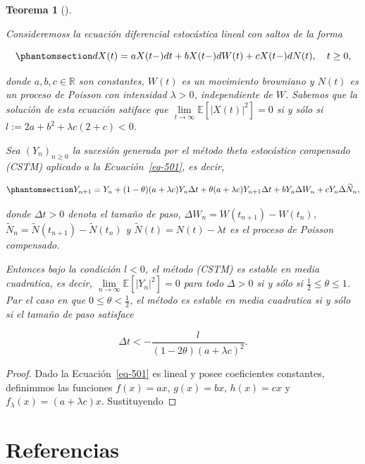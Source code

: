 \documentclass[
  spanish,
  us-letterpaper,
]{scrreprt}
\theoremstyle{plain}
\theoremstyle{plain}
\theoremstyle{definition}
\theoremstyle{plain}
\newtheorem{theorem}{Teorema}[chapter]
\theoremstyle{remark}
\begin{document}
\begin{theorem}[]\protect\hypertarget{thm-varmues}{}\label{thm-varmues}

Consideremoss la ecuación diferencial estocástica lineal con saltos de
la forma

\begin{equation}\phantomsection\label{eq-501}{
    dX(t)=aX(t-)dt+bX(t-)dW(t)+cX(t-)dN(t),\ \ \ t\geq 0,
}\end{equation}

donde \(a,b,c\in \mathbb{R}\) son constantes, \(W(t)\) es un movimiento
browniano y \(N(t)\) es un proceso de Poisson con intensidad
\(\lambda>0\), independiente de \(W\). Sabemos que la solución de esta
ecuación satiface que
\(\displaystyle \lim\limits_{t\rightarrow\infty}\mathbb{E}[|X(t)|^2]=0\)
si y sólo si \(l:=2a+b^2+\lambda c(2+c)<0\).

Sea \((Y_n)_{n\geq 0}\) la sucesión generada por el método theta
estocástico compensado (CSTM) aplicado a la Ecuación~\ref{eq-501}, es
decir,

\begin{equation}\phantomsection\label{eq-502}{
    Y_{n+1}=Y_n+(1-\theta)(a+\lambda c)Y_n\Delta t+\theta(a+\lambda c)Y_{n+1}\Delta t+bY_n\Delta W_n+cY_n\Delta \widetilde{N}_n,
}\end{equation}

donde \(\Delta t>0\) denota el tamaño de paso,
\(\Delta W_n=W(t_{n+1})-W(t_n)\),
\(\widetilde{N}_n=\widetilde{N}(t_{n+1})-\widetilde{N}(t_n)\) y
\(\widetilde{N}(t)=N(t)-\lambda t\) es el proceso de Poisson compensado.

Entonces bajo la condición \(l<0\), el método (CSTM) es estable en media
cuadratica, es decir,
\(\lim\limits_{n\rightarrow\infty}\mathbb{E}[|Y_n|^2]=0\) para todo
\(\Delta >0\) si y sólo si
\(\displaystyle \frac{1}{2}\leq \theta\leq 1\). Par el caso en que
\(\displaystyle 0\leq\theta<\frac{1}{2}\), el método es estable en media
cuadratica si y sólo si el tamaño de paso satisface

\[
    \Delta t<-\frac{l}{(1-2\theta)(a+\lambda c)^2}.
\]

\end{theorem}

\begin{proof}
Dado la Ecuación~\ref{eq-501} es lineal y posee coeficientes constantes,
definimmos las funciones \(f(x)=ax\), \(g(x)=bx\), \(h(x)=cx\) y
\(f_{\lambda}(x)=(a+\lambda c)x\). Sustituyendo
\end{proof}


\chapter{Referencias}\label{referencias}
\end{document}
